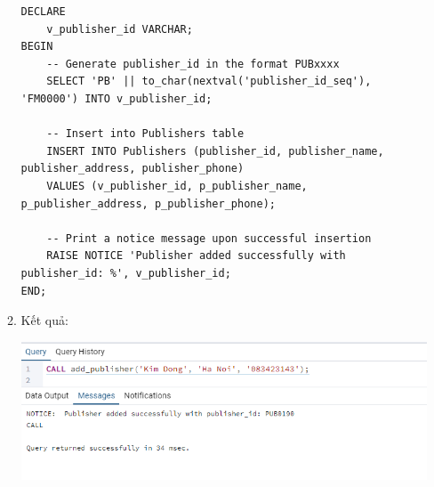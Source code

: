 \documentclass[12pt]{article}
\begin{document}
\begin{enumerate}
\begin{enumerate}
\begin{lstlisting}
DECLARE
    v_publisher_id VARCHAR;
BEGIN
    -- Generate publisher_id in the format PUBxxxx
    SELECT 'PB' || to_char(nextval('publisher_id_seq'), 'FM0000') INTO v_publisher_id;

    -- Insert into Publishers table
    INSERT INTO Publishers (publisher_id, publisher_name, publisher_address, publisher_phone)
    VALUES (v_publisher_id, p_publisher_name, p_publisher_address, p_publisher_phone);

    -- Print a notice message upon successful insertion
    RAISE NOTICE 'Publisher added successfully with publisher_id: %', v_publisher_id;
END;
        \end{lstlisting}
        \item Kết quả:

\includegraphics[width=0.95\linewidth]{Screenshot 2024-06-22 182659.png}
    \end{enumerate}
\end{enumerate}
\end{document}
